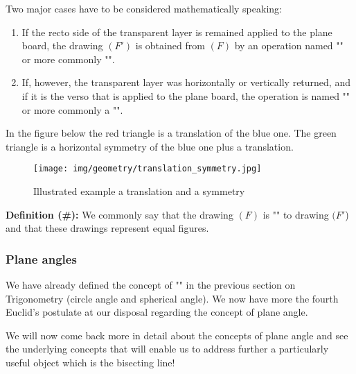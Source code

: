 	Two major cases have to be considered mathematically speaking:
	\begin{enumerate}
		\item If the recto side of the transparent layer is remained applied to the plane board, the drawing $(F')$ is obtained from $(F)$ by an operation named "" or more commonly "".
		
		\item If, however, the transparent layer was horizontally or vertically returned, and if it is the verso that is applied to the plane board, the operation is named "" or more commonly a "".
	\end{enumerate}
	In the figure below the red triangle is a translation of the blue one. The green triangle is a horizontal symmetry of the blue one plus a translation.
	\begin{figure}[H]
		\centering
		\texttt{[image: img/geometry/translation\_symmetry.jpg]}
		\caption{Illustrated example a translation and a symmetry}
	\end{figure}
	
	\textbf{Definition (\#\mydef):} We commonly say that the drawing $(F)$ is "" to drawing $(F '$) and that these drawings represent equal figures.

	\subsubsection{Plane angles}
	We have already defined the concept of "" in the previous section on Trigonometry (circle angle and spherical angle). We now have more the fourth Euclid's postulate at our disposal regarding the concept of plane angle.
	
	We will now come back more in detail about the concepts of plane angle and see the underlying concepts that will enable us to address further a particularly useful object which is the bisecting line!


